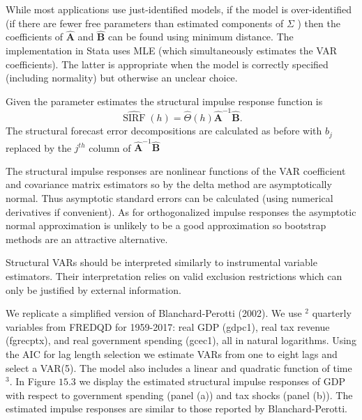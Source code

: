 \documentclass[10pt]{article}
\begin{document}
While most applications use just-identified models, if the model is over-identified (if there are fewer free parameters than estimated components of $\Sigma$ ) then the coefficients of $\widehat{\boldsymbol{A}}$ and $\widehat{\boldsymbol{B}}$ can be found using minimum distance. The implementation in Stata uses MLE (which simultaneously estimates the VAR coefficients). The latter is appropriate when the model is correctly specified (including normality) but otherwise an unclear choice.

Given the parameter estimates the structural impulse response function is
$$
\widehat{\operatorname{SIRF}}(h)=\widehat{\Theta}(h) \widehat{\boldsymbol{A}}^{-1} \widehat{\boldsymbol{B}} .
$$
The structural forecast error decompositions are calculated as before with $b_{j}$ replaced by the $j^{t h}$ column of $\widehat{\boldsymbol{A}}^{-1} \widehat{\boldsymbol{B}}$

The structural impulse responses are nonlinear functions of the VAR coefficient and covariance matrix estimators so by the delta method are asymptotically normal. Thus asymptotic standard errors can be calculated (using numerical derivatives if convenient). As for orthogonalized impulse responses the asymptotic normal approximation is unlikely to be a good approximation so bootstrap methods are an attractive alternative.

Structural VARs should be interpreted similarly to instrumental variable estimators. Their interpretation relies on valid exclusion restrictions which can only be justified by external information.

We replicate a simplified version of Blanchard-Perotti (2002). We use ${ }^{2}$ quarterly variables from FREDQD for 1959-2017: real GDP (gdpc1), real tax revenue (fgrecptx), and real government spending (gcec1), all in natural logarithms. Using the AIC for lag length selection we estimate VARs from one to eight lags and select a VAR(5). The model also includes a linear and quadratic function of time ${ }^{3}$. In Figure $15.3$ we display the estimated structural impulse responses of GDP with respect to government spending (panel (a)) and tax shocks (panel (b)). The estimated impulse responses are similar to those reported by Blanchard-Perotti.
\end{document}
